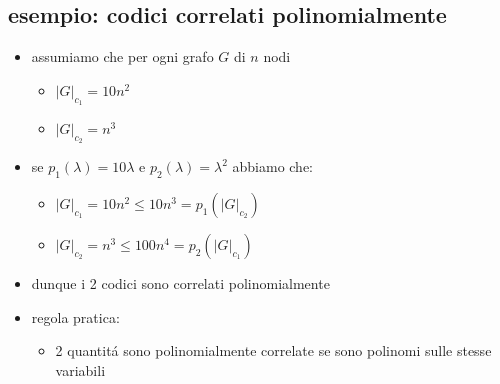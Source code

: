 \subsection*{esempio: codici correlati polinomialmente}
\begin{flushleft}
	\begin{itemize}
		\item assumiamo che per ogni grafo $G$ di $n$ nodi
		\begin{itemize}
			\item $|G|_{c_1}=10n^2$
			\item $|G|_{c_2}=n^3$
		\end{itemize}
		\item se $p_1(\lambda)=10\lambda$ e $p_2(\lambda)=\lambda^2$ abbiamo che:
		\begin{itemize}
			\item $|G|_{c_1}=10n^2\leq 10n^3=p_1(|G|_{c_2})$
			\item $|G|_{c_2}=n^3\leq 100n^4=p_2(|G|_{c_1})$
		\end{itemize}
		\item dunque i 2 codici sono correlati polinomialmente
		\vspace{1cm}
		\item regola pratica:
		\begin{itemize}
			\item 2 quantit\'a sono polinomialmente correlate se sono polinomi sulle stesse variabili
		\end{itemize}
	\end{itemize}
\end{flushleft}


